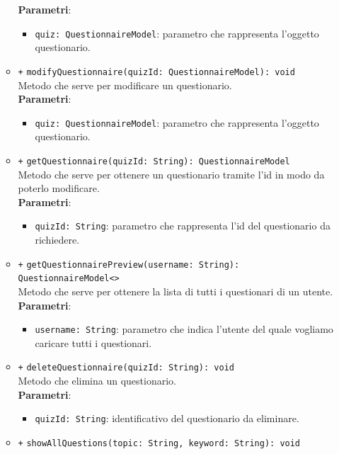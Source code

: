 \begin{itemize}
\begin{itemize}
			\textbf{Parametri}:
			\begin{itemize}
				\item
				\texttt{quiz: QuestionnaireModel}: parametro che rappresenta l'oggetto questionario.
			\end{itemize}
		\item \texttt{+} \texttt{modifyQuestionnaire(quizId: QuestionnaireModel): void} \\ Metodo che serve per modificare un questionario. \\
			\textbf{Parametri}:
			\begin{itemize}
				\item \texttt{quiz: QuestionnaireModel}: parametro che rappresenta l'oggetto questionario.
			\end{itemize}
		\item \texttt{+} \texttt{getQuestionnaire(quizId: String): QuestionnaireModel} \\Metodo che serve per ottenere un questionario tramite l'id in modo da poterlo modificare. \\
			\textbf{Parametri}:
			\begin{itemize}
				\item \texttt{quizId: String}: parametro che rappresenta l'id del questionario da richiedere.
			\end{itemize}
		\item \texttt{+} \texttt{getQuestionnairePreview(username: String): QuestionnaireModel<>} \\ Metodo che serve per ottenere la lista di tutti i questionari di un utente. \\
			\textbf{Parametri}:
			\begin{itemize}
				\item \texttt{username: String}: parametro che indica l'utente del quale vogliamo caricare tutti i questionari.
			\end{itemize}
		\item \texttt{+} \texttt{deleteQuestionnaire(quizId: String): void} \\Metodo che elimina un questionario. \\
		\textbf{Parametri}:
		\begin{itemize}
			\item
			\texttt{quizId: String}: identificativo del questionario da eliminare.
		\end{itemize}
		\item \texttt{+} \texttt{showAllQuestions(topic: String, keyword: String): void} \\

\end{itemize}
\end{itemize}
